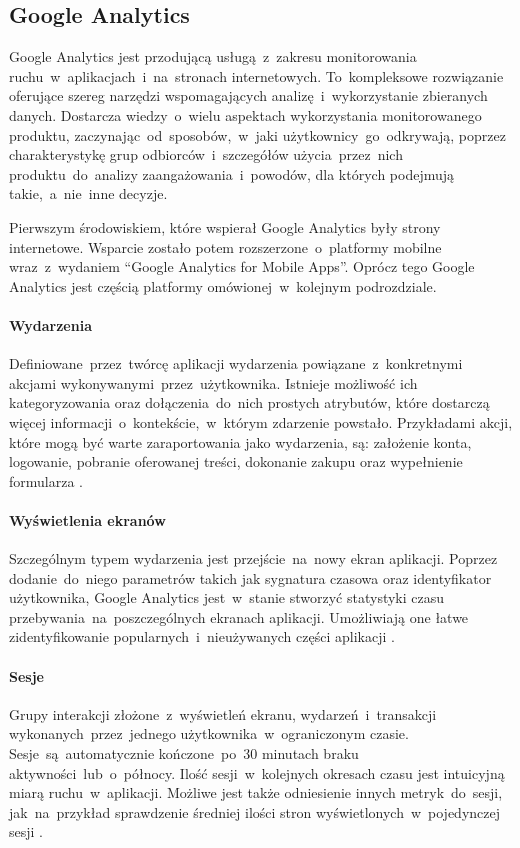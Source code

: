 \subsection{Google Analytics}
\label{sec:ga}
Google Analytics jest przodującą usługą~z~zakresu monitorowania ruchu~w~aplikacjach~i~na~stronach internetowych. To~kompleksowe rozwiązanie oferujące szereg narzędzi wspomagających analizę~i~wykorzystanie zbieranych danych. Dostarcza wiedzy~o~wielu aspektach wykorzystania monitorowanego produktu, zaczynając~od~sposobów,~w~jaki użytkownicy~go~odkrywają, poprzez charakterystykę grup odbiorców~i~szczegółów użycia~przez~nich produktu~do~analizy zaangażowania~i~powodów, dla których podejmują takie,~a~nie~inne decyzje.

Pierwszym środowiskiem, które wspierał Google Analytics były strony internetowe. Wsparcie zostało potem rozszerzone~o~platformy mobilne wraz~z~wydaniem ``Google Analytics for Mobile Apps''. Oprócz tego Google Analytics jest częścią platformy  omówionej~w~kolejnym podrozdziale.

\bigskip
{}

\paragraph{Wydarzenia}
\label{par:ga-events}
Definiowane~przez~twórcę aplikacji wydarzenia powiązane~z~konkretnymi akcjami wykonywanymi~przez~użytkownika. Istnieje możliwość ich kategoryzowania oraz dołączenia~do~nich prostych atrybutów, które dostarczą więcej informacji~o~kontekście,~w~którym zdarzenie powstało. Przykładami akcji, które mogą być warte zaraportowania jako wydarzenia, są: założenie konta, logowanie, pobranie oferowanej treści, dokonanie zakupu oraz wypełnienie formularza \cite{GA_Events}.

\paragraph{Wyświetlenia ekranów}
Szczególnym typem wydarzenia jest przejście~na~nowy ekran aplikacji. Poprzez dodanie~do~niego parametrów takich jak sygnatura czasowa oraz identyfikator użytkownika, Google Analytics jest~w~stanie stworzyć statystyki czasu przebywania~na~poszczególnych ekranach aplikacji. Umożliwiają one łatwe zidentyfikowanie popularnych~i~nieużywanych części aplikacji \cite{GA_Pages}.

\paragraph{Sesje}
Grupy interakcji złożone~z~wyświetleń ekranu, wydarzeń~i~transakcji wykonanych~przez~jednego użytkownika~w~ograniczonym czasie. Sesje~są~automatycznie kończone~po~30 minutach braku aktywności~lub~o~północy. Ilość sesji~w~kolejnych okresach czasu jest intuicyjną miarą ruchu~w~aplikacji. Możliwe jest także odniesienie innych metryk~do~sesji, jak~na~przykład sprawdzenie średniej ilości stron wyświetlonych~w~pojedynczej sesji \cite{GA_Sessions}.

